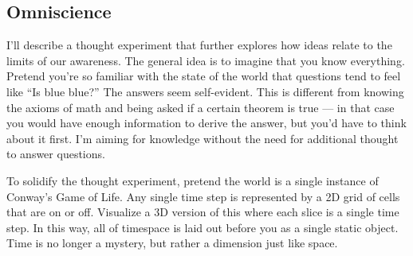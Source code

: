 \documentclass[11pt, oneside]{article}   	%
\begin{document}
%

\subsection{Omniscience}


I'll describe a thought experiment that further explores
how ideas relate to the limits of our awareness.
The general idea is to imagine that you know everything.
Pretend
you're so familiar with the state of the world that questions tend to
feel like ``Is blue blue?'' The answers seem self-evident.
This is
different from knowing the axioms of math and being asked if a certain theorem
is true --- in that case you would have enough information to derive the answer,
but you'd have to think about it first.
I'm aiming for knowledge without the need for additional thought to answer
questions.

To solidify the thought experiment, pretend the world is a single instance of
Conway's Game of Life. Any single time step is represented by a 2D grid of cells
that are on or off.
Visualize a 3D version of this where each slice is a single time step. In this
way, all of timespace is laid out before you as a single static object. Time is
no longer a mystery, but rather a dimension just like space.
\end{document}
